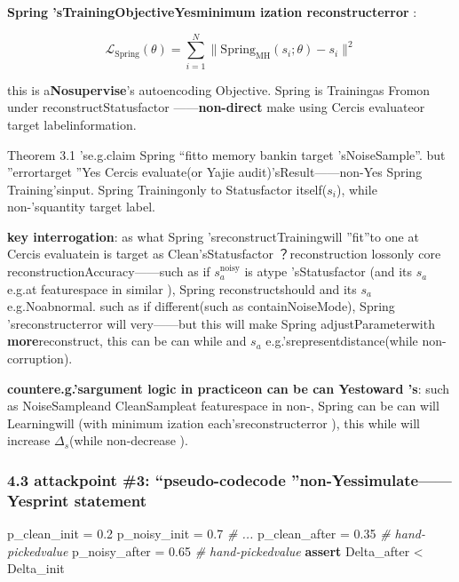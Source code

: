 \documentclass[
  12pt,
]{article}
\newenvironment{Shaded}{}{}
\newcommand{\CommentTok}[1]{\textcolor[rgb]{0.38,0.63,0.69}{\textit{#1}}}
\newcommand{\ControlFlowTok}[1]{\textcolor[rgb]{0.00,0.44,0.13}{\textbf{#1}}}
\newcommand{\FloatTok}[1]{\textcolor[rgb]{0.25,0.63,0.44}{#1}}
\newcommand{\NormalTok}[1]{#1}
\newcommand{\OperatorTok}[1]{\textcolor[rgb]{0.40,0.40,0.40}{#1}}
\begin{document}
\textbf{Spring 'sTrainingObjectiveYesminimum ization reconstructerror }: 

\[\mathcal{L}_{\text{Spring}}(\theta) = \sum_{i=1}^{N} \|\text{Spring}_{\text{MH}}(s_i; \theta) - s_i\|^2\]

this is a\textbf{Nosupervise}'s autoencoding Objective. Spring
is Trainingas Fromon under reconstructStatusfactor ------\textbf{non-direct }make using  Cercis
evaluateor target labelinformation. 

Theorem 3.1 'se.g.claim Spring
``fitto memory bankin target 'sNoiseSample''. but ''errortarget ''Yes Cercis
evaluate(or Yajie audit)'sResult------non-Yes Spring Training'sinput. Spring
Trainingonly to Statusfactor itself(\(s_i\)), while non-'squantity target label. 

\textbf{key interrogation}: as what Spring 'sreconstructTrainingwill ''fit''to one at  Cercis
evaluatein is target as Clean'sStatusfactor ？reconstruction lossonly core reconstructionAccuracy------such as if
\(s_a^{\text{noisy}}\) is atype 'sStatusfactor (and its  \(s_a\)
e.g.at featurespace in similar ), Spring reconstructshould and its  \(s_a\)
e.g.Noabnormal. such as if different(such as containNoiseMode), Spring
'sreconstructerror will very------but this will make  Spring
adjustParameterwith \textbf{more}reconstruct, this can be can while and  \(s_a\)
e.g.'srepresentdistance(while non-corruption). 

\textbf{countere.g.'sargument logic in practiceon can be can Yestoward 's}: such as NoiseSampleand CleanSampleat featurespace in non-, Spring
can be can will Learningwill (with minimum ization each'sreconstructerror ), this while will increase 
\(\Delta_s\)(while non-decrease ). 

\subsubsection{4.3 attackpoint 
\#3: ``pseudo-codecode ''non-Yessimulate------Yesprint statement}\label{ux653bux51fbux70b9-3ux4f2aux4ee3ux7801ux4e0dux662fux6a21ux62dfux662fux6253ux5370ux8bedux53e5}

\begin{Shaded}
\begin{Highlighting}[]
\NormalTok{p\_clean\_init }\OperatorTok{=} \FloatTok{0.2}
\NormalTok{p\_noisy\_init }\OperatorTok{=} \FloatTok{0.7}
\CommentTok{\# ... }
\NormalTok{p\_clean\_after }\OperatorTok{=} \FloatTok{0.35}   \CommentTok{\# hand-pickedvalue }
\NormalTok{p\_noisy\_after }\OperatorTok{=} \FloatTok{0.65}   \CommentTok{\# hand-pickedvalue }
\ControlFlowTok{assert}\NormalTok{ Delta\_after }\OperatorTok{\textless{}}\NormalTok{ Delta\_init}
\end{Highlighting}
\end{Shaded}
\end{document}
